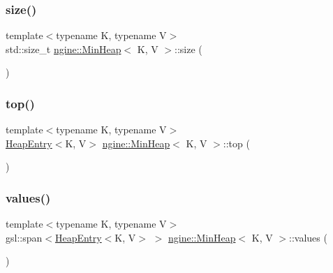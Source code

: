 \mbox{\label{classngine_1_1MinHeap_a20d4550e309886329c6b306ec481c75c}} 
\subsubsection{\texorpdfstring{size()}{size()}}
{\footnotesize\ttfamily template$<$typename K, typename V$>$ \\
std\+::size\+\_\+t \hyperlink{classngine_1_1MinHeap}{ngine\+::\+Min\+Heap}$<$ K, V $>$\+::size (\begin{DoxyParamCaption}{ }\end{DoxyParamCaption})\hspace{0.3cm}{\ttfamily [inline]}}

\mbox{\label{classngine_1_1MinHeap_a9766a8a89e8a0e91a97cbe274feefeaf}} 
\subsubsection{\texorpdfstring{top()}{top()}}
{\footnotesize\ttfamily template$<$typename K, typename V$>$ \\
\hyperlink{structngine_1_1HeapEntry}{Heap\+Entry}$<$K, V$>$ \hyperlink{classngine_1_1MinHeap}{ngine\+::\+Min\+Heap}$<$ K, V $>$\+::top (\begin{DoxyParamCaption}{ }\end{DoxyParamCaption})\hspace{0.3cm}{\ttfamily [inline]}}

\mbox{\label{classngine_1_1MinHeap_a69d812170774044fb92f695c9249bdfb}} 
\subsubsection{\texorpdfstring{values()}{values()}}
{\footnotesize\ttfamily template$<$typename K, typename V$>$ \\
gsl\+::span$<$\hyperlink{structngine_1_1HeapEntry}{Heap\+Entry}$<$K, V$>$ $>$ \hyperlink{classngine_1_1MinHeap}{ngine\+::\+Min\+Heap}$<$ K, V $>$\+::values (\begin{DoxyParamCaption}{ }\end{DoxyParamCaption})\hspace{0.3cm}{\ttfamily [inline]}}



